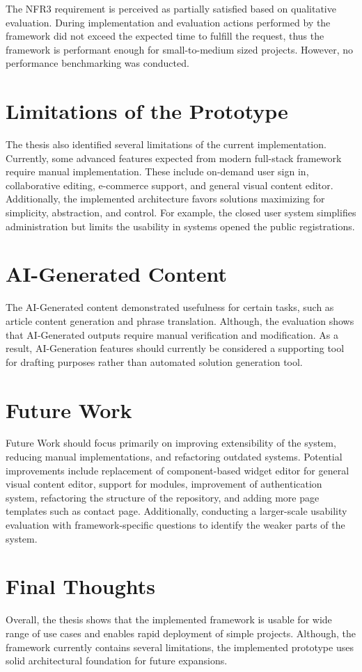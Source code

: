 The NFR3 requirement is perceived as partially satisfied based on qualitative evaluation.
During implementation and evaluation actions performed by the framework did not exceed the expected time to fulfill the request,
thus the framework is performant enough for small-to-medium sized projects.
However, no performance benchmarking was conducted.

\section*{Limitations of the Prototype}\label{sec:limitations-of-the-prototype}
The thesis also identified several limitations of the current implementation.
Currently, some advanced features expected from modern full-stack framework require manual implementation.
These include on-demand user sign in, collaborative editing, e-commerce support, and general visual content editor.
Additionally, the implemented architecture favors solutions maximizing for simplicity, abstraction, and control.
For example, the closed user system simplifies administration but limits the usability in systems opened the public registrations.

\section*{AI-Generated Content}\label{sec:ai-generated-content}
The AI-Generated content demonstrated usefulness for certain tasks, such as article content generation and phrase translation.
Although, the evaluation shows that AI-Generated outputs require manual verification and modification.
As a result, AI-Generation features should currently be considered a supporting tool for drafting purposes rather
than automated solution generation tool.

\section*{Future Work}\label{sec:future-work}
Future Work should focus primarily on improving extensibility of the system, reducing manual implementations, and refactoring
outdated systems.
Potential improvements include replacement of component-based widget editor for general visual content editor,
support for modules, improvement of authentication system, refactoring the structure of the repository, and adding more
page templates such as contact page.
Additionally, conducting a larger-scale usability evaluation with framework-specific questions to identify the weaker parts of the system.

\section*{Final Thoughts}\label{sec:final-thoughts}
Overall, the thesis shows that the implemented framework is usable for wide range of use cases and enables rapid deployment
of simple projects.
Although, the framework currently contains several limitations, the implemented prototype uses solid architectural foundation for future expansions.
